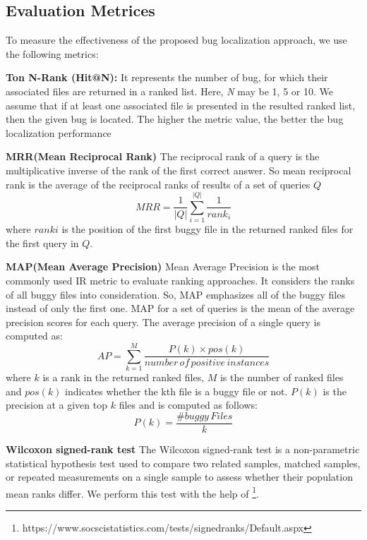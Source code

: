 \documentclass[conference]{IEEEtran}
\begin{document}
\subsection{Evaluation Metrices}
To measure the effectiveness of the proposed bug localization approach, we use the following metrics:

\textbf{Ton N-Rank (Hit@N):} It represents the number of bug, for which their associated files are returned in a ranked list. Here, \textit{N} may be 1, 5 or 10. We assume that if at least one associated file is presented in the resulted ranked list, then the given bug is located. The higher the metric value, the better the bug localization performance

\textbf{MRR(Mean Reciprocal Rank)}
The reciprocal rank of a query is the multiplicative inverse of the rank of the first correct answer. So mean reciprocal rank is the average of the reciprocal ranks of results of a set of queries $Q$
\begin{equation}
MRR=\frac{1}{\left | Q \right |}\sum_{i=1}^{\left | Q \right |}\frac{1}{rank_{i}}
\end{equation}
where $ranki$ is the position of the first buggy file in the returned ranked files for the first query in $Q$.

\textbf{MAP(Mean Average Precision)}
Mean Average Precision is the most commonly used IR metric to evaluate ranking approaches. It considers the ranks of all buggy files into consideration. So, MAP emphasizes all of the buggy files instead of only the first one.
MAP for a set of queries is the mean of the average precision scores for each query. The average precision of a single query is computed as:
\begin{equation}
AP=\sum_{k=1}^{M}\frac{P(k)\times pos(k)}{number \, of \, positive \, instances}
\end{equation}
where $k$ is a rank in the returned ranked files, $M$ is the number of ranked files and $pos(k)$ indicates whether the kth file is a buggy file or not. $P(k)$ is the precision at a given top $k$ files and is computed as follows:
\begin{equation}
P(k)=\frac{\#buggy \, Files}{k}
\end{equation}

\textbf{Wilcoxon signed-rank test}
The Wilcoxon signed-rank test is a non-parametric statistical hypothesis test used to compare two related samples, matched samples, or repeated measurements on a single sample to assess whether their population mean ranks differ. We perform this test with the help of \footnote{https://www.socscistatistics.com/tests/signedranks/Default.aspx}.
\end{document}
